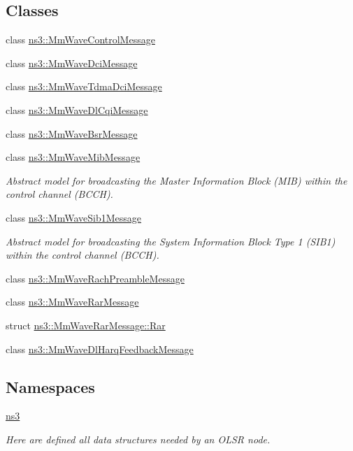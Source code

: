 \subsection*{Classes}
\begin{DoxyCompactItemize}
\item 
class \hyperlink{classns3_1_1MmWaveControlMessage}{ns3\+::\+Mm\+Wave\+Control\+Message}
\item 
class \hyperlink{classns3_1_1MmWaveDciMessage}{ns3\+::\+Mm\+Wave\+Dci\+Message}
\item 
class \hyperlink{classns3_1_1MmWaveTdmaDciMessage}{ns3\+::\+Mm\+Wave\+Tdma\+Dci\+Message}
\item 
class \hyperlink{classns3_1_1MmWaveDlCqiMessage}{ns3\+::\+Mm\+Wave\+Dl\+Cqi\+Message}
\item 
class \hyperlink{classns3_1_1MmWaveBsrMessage}{ns3\+::\+Mm\+Wave\+Bsr\+Message}
\item 
class \hyperlink{classns3_1_1MmWaveMibMessage}{ns3\+::\+Mm\+Wave\+Mib\+Message}
\begin{DoxyCompactList}\small\item\em Abstract model for broadcasting the Master Information Block (M\+IB) within the control channel (B\+C\+CH). \end{DoxyCompactList}\item 
class \hyperlink{classns3_1_1MmWaveSib1Message}{ns3\+::\+Mm\+Wave\+Sib1\+Message}
\begin{DoxyCompactList}\small\item\em Abstract model for broadcasting the System Information Block Type 1 (S\+I\+B1) within the control channel (B\+C\+CH). \end{DoxyCompactList}\item 
class \hyperlink{classns3_1_1MmWaveRachPreambleMessage}{ns3\+::\+Mm\+Wave\+Rach\+Preamble\+Message}
\item 
class \hyperlink{classns3_1_1MmWaveRarMessage}{ns3\+::\+Mm\+Wave\+Rar\+Message}
\item 
struct \hyperlink{structns3_1_1MmWaveRarMessage_1_1Rar}{ns3\+::\+Mm\+Wave\+Rar\+Message\+::\+Rar}
\item 
class \hyperlink{classns3_1_1MmWaveDlHarqFeedbackMessage}{ns3\+::\+Mm\+Wave\+Dl\+Harq\+Feedback\+Message}
\end{DoxyCompactItemize}
\subsection*{Namespaces}
\begin{DoxyCompactItemize}
\item 
 \hyperlink{namespacens3}{ns3}
\begin{DoxyCompactList}\small\item\em Here are defined all data structures needed by an O\+L\+SR node. \end{DoxyCompactList}\end{DoxyCompactItemize}
